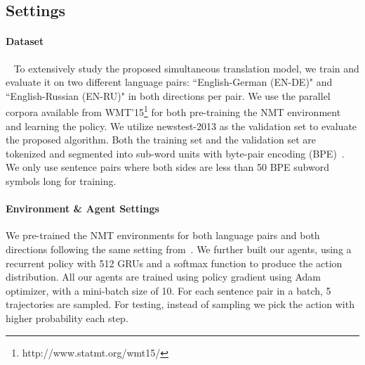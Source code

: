\subsection{Settings}
\paragraph{Dataset}~
To extensively study the proposed simultaneous translation model, we train and evaluate it on two different language pairs: ``English-German (EN-DE)" and ``English-Russian (EN-RU)" in both directions per pair. We use the parallel corpora available from WMT'15\footnote{http://www.statmt.org/wmt15/} for both pre-training the NMT environment and learning the policy. We utilize newstest-2013 as the validation set to evaluate the proposed algorithm. Both the training set and the validation set are tokenized and segmented into sub-word units with byte-pair encoding (BPE)~\cite{sennrich2015neural}. We only use sentence pairs where both sides are less than 50 BPE subword symbols long for training.

\paragraph{Environment \& Agent Settings}
We pre-trained the NMT environments for both language pairs and both directions following the same setting from~\cite{cho2016can}. %
We further built our agents, using a recurrent policy with 512 GRUs and a softmax function to produce the action distribution. All our agents are trained using policy gradient using Adam~\cite{kingma2014adam} optimizer, with a mini-batch size of 10. For each sentence pair in a batch, 5 trajectories are sampled. 
For testing, instead of sampling we pick the action with higher probability each step.



